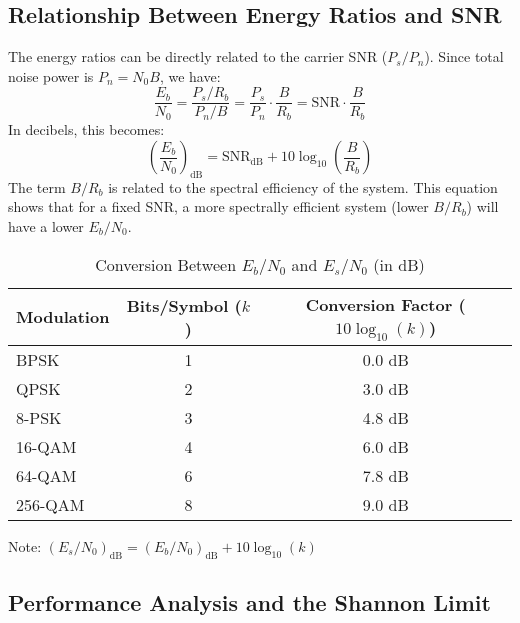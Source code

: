 \subsection{Relationship Between Energy Ratios and SNR}

The energy ratios can be directly related to the carrier SNR ($P_s/P_n$). Since total noise power is $P_n = N_0 B$, we have:
\begin{equation}
    \frac{E_b}{N_0} = \frac{P_s/R_b}{P_n/B} = \frac{P_s}{P_n} \cdot \frac{B}{R_b} = \text{SNR} \cdot \frac{B}{R_b}
\end{equation}
In decibels, this becomes:
\begin{equation}
    \left(\frac{E_b}{N_0}\right)_{\text{dB}} = \text{SNR}_{\text{dB}} + 10\log_{10}\left(\frac{B}{R_b}\right)
\end{equation}
The term $B/R_b$ is related to the spectral efficiency of the system. This equation shows that for a fixed SNR, a more spectrally efficient system (lower $B/R_b$) will have a lower $E_b/N_0$.

\begin{table}[H]
    \centering
    \caption{Conversion Between $E_b/N_0$ and $E_s/N_0$ (in dB)}
    \label{tab:ebno-esno-conversion}
    \begin{tabular}{@{}lcc@{}}
        \toprule
        \tableheaderfont Modulation & \tableheaderfont Bits/Symbol ($k$) & \tableheaderfont Conversion Factor ($10\log_{10}(k)$) \\
        \midrule
        BPSK & 1 & 0.0 dB \\
        QPSK & 2 & 3.0 dB \\
        8-PSK & 3 & 4.8 dB \\
        16-QAM & 4 & 6.0 dB \\
        64-QAM & 6 & 7.8 dB \\
        256-QAM & 8 & 9.0 dB \\
        \bottomrule
    \end{tabular}
    \par\vspace{0.5em}
    \small Note: $\left(E_s/N_0\right)_{\text{dB}} = \left(E_b/N_0\right)_{\text{dB}} + 10\log_{10}(k)$
\end{table}


\subsection{Performance Analysis and the Shannon Limit}

